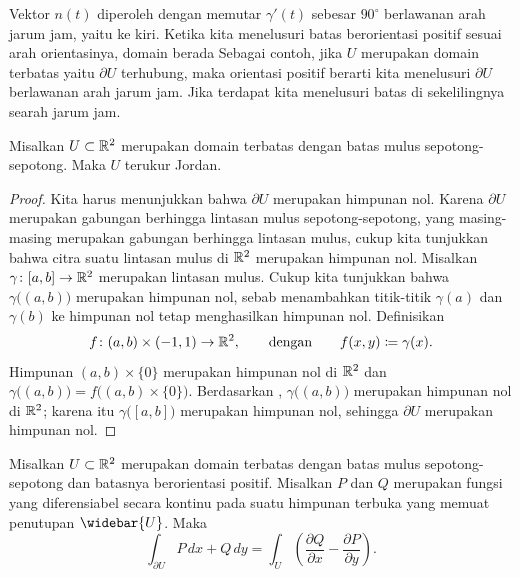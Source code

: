 Vektor $n(t)$ diperoleh dengan memutar $\gamma'(t)$
sebesar $90^\circ$ berlawanan arah jarum jam, yaitu ke kiri.
Ketika kita menelusuri batas berorientasi positif
sesuai arah orientasinya,
domain berada 
Sebagai contoh,
jika $U$ merupakan domain terbatas  yaitu $\partial U$
terhubung, maka orientasi positif berarti kita menelusuri $\partial U$
berlawanan arah jarum jam.  Jika terdapat  kita menelusuri
batas di sekelilingnya searah jarum jam.

\begin{prop}
Misalkan $U \subset {\mathbb{R}}^2$ merupakan domain terbatas dengan batas mulus
sepotong-sepotong.  Maka $U$ terukur Jordan.
\end{prop}

\begin{proof}
Kita harus menunjukkan bahwa
$\partial U$ merupakan himpunan nol.  Karena $\partial U$ merupakan gabungan
berhingga lintasan mulus sepotong-sepotong, yang masing-masing merupakan
gabungan berhingga lintasan mulus, cukup kita tunjukkan bahwa citra suatu
lintasan mulus di ${\mathbb{R}}^2$ merupakan himpunan nol.
Misalkan $\gamma \colon [a,b] \to {\mathbb{R}}^2$ merupakan lintasan mulus.
Cukup kita tunjukkan bahwa
$\gamma\bigl((a,b)\bigr)$ merupakan himpunan nol, sebab menambahkan
titik-titik $\gamma(a)$ dan $\gamma(b)$
ke himpunan nol tetap menghasilkan himpunan nol.
Definisikan
\begin{equation*}
f \colon (a,b) \times (-1,1) \to {\mathbb{R}}^2,
\qquad \text{dengan} \qquad
f(x,y) \coloneqq \gamma(x) .
\end{equation*}
Himpunan $(a,b) \times \{ 0 \}$ merupakan himpunan nol di ${\mathbb{R}}^2$ dan
$\gamma\bigl((a,b)\bigr) = f\bigl( (a,b) \times \{ 0 \} \bigr)$.
Berdasarkan ,
$\gamma\bigl((a,b)\bigr)$ merupakan himpunan nol di ${\mathbb{R}}^2$;
karena itu
$\gamma\bigl([a,b]\bigr)$ merupakan himpunan nol, sehingga
$\partial U$ merupakan himpunan nol.
\end{proof}

\begin{thm}[Green]
Misalkan $U \subset {\mathbb{R}}^2$ merupakan domain terbatas dengan batas mulus
sepotong-sepotong dan batasnya berorientasi positif.  Misalkan $P$ dan $Q$
merupakan fungsi yang diferensiabel secara kontinu pada suatu himpunan terbuka
yang memuat penutupan $\widebar{U}$.  Maka
\begin{equation*}
\int_{\partial U}
P \, dx + Q\,  dy
=
\int_{U}
\left(\frac{\partial Q}{\partial x} - \frac{\partial P}{\partial y} \right)
.
\end{equation*}
\end{thm}

